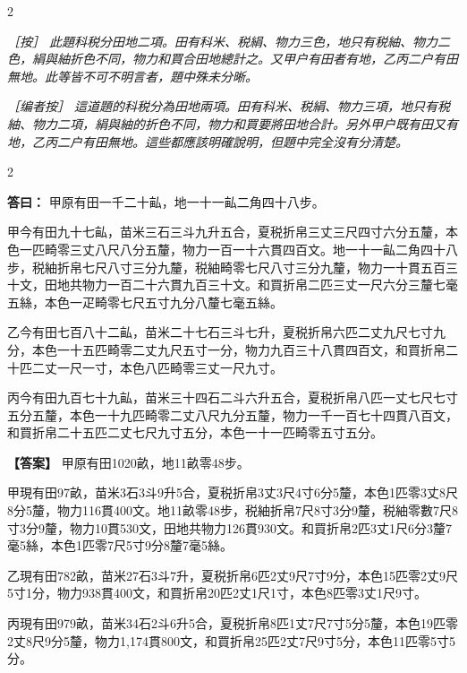 \documentclass[11pt,a4paper]{article}
\newcommand{\ClassicalAnswer}[1]{\par\noindent\textbf{\color{answercolor}答曰：}#1\par}
\newcommand{\ClassicalNote}[1]{\par\noindent\textit{［按］#1}\par}
\newcommand{\ModernAnswer}[1]{\par\noindent\textbf{\color{answercolor}【答案】}#1\par}
\newcommand{\ModernNote}[1]{\par\noindent\textit{\color{notecolor}［编者按］#1}\par}
\begin{document}
\begin{paracol}{2}

\ClassicalNote{%
此題科税分田地二項。田有科米、税絹、物力三色，地只有税紬、物力二色，絹與紬折色不同，物力和買合田地總計之。又甲户有田者有地，乙丙二户有田無地。此等皆不可不明言者，題中殊未分晰。}

\switchcolumn

\ModernNote{%
這道題的科税分為田地兩項。田有科米、税絹、物力三項，地只有税紬、物力二項，絹與紬的折色不同，物力和買要將田地合計。另外甲户既有田又有地，乙丙二户有田無地。這些都應該明確說明，但題中完全沒有分清楚。
}

\end{paracol}

\begin{paracol}{2}

\ClassicalAnswer{%
甲原有田一千二十畆，地一十一畆二角四十八步。

甲今有田九十七畆，苗米三石三斗九升五合，夏税折帛三丈三尺四寸六分五釐，本色一匹畸零三丈八尺八分五釐，物力一百一十六貫四百文。地一十一畆二角四十八步，税紬折帛七尺八寸三分九釐，税紬畸零七尺八寸三分九釐，物力一十貫五百三十文，田地共物力一百二十六貫九百三十文。和買折帛二匹三丈一尺六分三釐七毫五絲，本色一疋畸零七尺五寸九分八釐七毫五絲。

乙今有田七百八十二畆，苗米二十七石三斗七升，夏税折帛六匹二丈九尺七寸九分，本色一十五匹畸零二丈九尺五寸一分，物力九百三十八貫四百文，和買折帛二十匹二丈一尺一寸，本色八匹畸零三丈一尺九寸。

丙今有田九百七十九畆，苗米三十四石二斗六升五合，夏税折帛八匹一丈七尺七寸五分五釐，本色一十九匹畸零二丈八尺九分五釐，物力一千一百七十四貫八百文，和買折帛二十五匹二丈七尺九寸五分，本色一十一匹畸零五寸五分。}

\switchcolumn

\ModernAnswer{%
甲原有田1020畝，地11畝零48步。

甲現有田97畝，苗米3石3斗9升5合，夏税折帛3丈3尺4寸6分5釐，本色1匹零3丈8尺8分5釐，物力116貫400文。地11畝零48步，税紬折帛7尺8寸3分9釐，税紬零數7尺8寸3分9釐，物力10貫530文，田地共物力126貫930文。和買折帛2匹3丈1尺6分3釐7毫5絲，本色1匹零7尺5寸9分8釐7毫5絲。

乙現有田782畝，苗米27石3斗7升，夏税折帛6匹2丈9尺7寸9分，本色15匹零2丈9尺5寸1分，物力938貫400文，和買折帛20匹2丈1尺1寸，本色8匹零3丈1尺9寸。

丙現有田979畝，苗米34石2斗6升5合，夏税折帛8匹1丈7尺7寸5分5釐，本色19匹零2丈8尺9分5釐，物力1,174貫800文，和買折帛25匹2丈7尺9寸5分，本色11匹零5寸5分。
}

\end{paracol}
\end{document}
